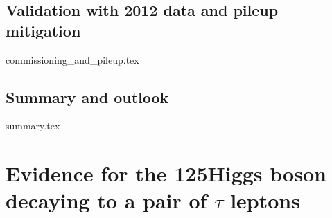 \documentclass[11pt,twoside,a4paper,tdr]{cms-tdr}
\begin{document}
\section{Validation with 2012 data and pileup mitigation}
\label{sec:commissioning_and_pileup}

{commissioning_and_pileup.tex}

\clearpage

\section{Summary and outlook}
\label{sec:summary}

{summary.tex}




\chapter{Evidence for the 125\GeV Higgs boson decaying to a pair of $\tau$ leptons}

\pagebreak 



\newpage 



 
\end{document}
